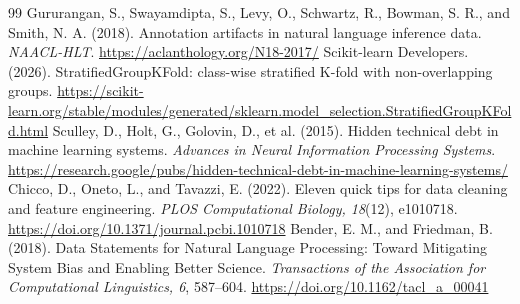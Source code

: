 \begin{thebibliography}{99}
 Gururangan, S., Swayamdipta, S., Levy, O., Schwartz, R., Bowman, S. R., and Smith, N. A. (2018). Annotation artifacts in natural language inference data. \textit{NAACL-HLT}. \url{https://aclanthology.org/N18-2017/}
 Scikit-learn Developers. (2026). StratifiedGroupKFold: class-wise stratified K-fold with non-overlapping groups. \url{https://scikit-learn.org/stable/modules/generated/sklearn.model_selection.StratifiedGroupKFold.html}
 Sculley, D., Holt, G., Golovin, D., et al. (2015). Hidden technical debt in machine learning systems. \textit{Advances in Neural Information Processing Systems}. \url{https://research.google/pubs/hidden-technical-debt-in-machine-learning-systems/}
 Chicco, D., Oneto, L., and Tavazzi, E. (2022). Eleven quick tips for data cleaning and feature engineering. \textit{PLOS Computational Biology, 18}(12), e1010718. \url{https://doi.org/10.1371/journal.pcbi.1010718}
 Bender, E. M., and Friedman, B. (2018). Data Statements for Natural Language Processing: Toward Mitigating System Bias and Enabling Better Science. \textit{Transactions of the Association for Computational Linguistics, 6}, 587--604. \url{https://doi.org/10.1162/tacl_a_00041}



\end{thebibliography}
